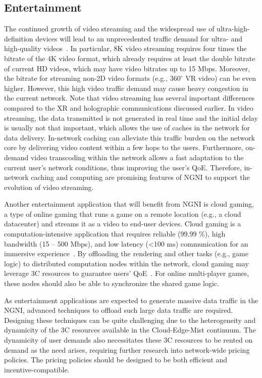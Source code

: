  \subsection{Entertainment}
 
\noindent The continued growth of video streaming and the widespread use of ultra-high-definition devices  will lead to an unprecedented traffic demand for ultra- and high-quality videos~\cite{rufino20216g}. In particular, 8K video streaming requires four times the bitrate of the 4K video format, which already requires at least the double bitrate of current HD videos, which may have video bitrates up to 15 Mbps. Moreover, the bitrate for streaming non-2D video formats (e.g., $360^\circ$ VR video) can be even higher. However, this high video traffic demand may cause heavy congestion in the current network. Note that video streaming has several important differences compared to the XR and holographic communications discussed earlier.  In video streaming, the data transmitted is not generated in real time and the initial delay is usually not that important, which allows the use of caches in the network for data delivery.  In-network caching can alleviate this traffic burden on the network core by delivering video content within a few hops to the users. Furthermore, on-demand video transcoding within the network allows a fast adaptation to the current user's network conditions, thus improving the user's QoE. Therefore, in-network caching and computing are promising features of NGNI to support the evolution of video streaming.
 
 Another entertainment application that will benefit from NGNI is cloud gaming, a type of online gaming that runs a game on a remote location (e.g., a cloud datacenter) and streams it as a video to end-user devices. Cloud gaming is a computation-intensive application that requires reliable (99.99 \%), high bandwidth (15 -- 500 Mbps), and low latency (\textless  100 ms) communication for an immersive experience~\cite{9464920}. By offloading the rendering and other tasks (e.g., game logic) to distributed computation nodes within the network, cloud gaming may leverage 3C resources to guarantee users’ QoE~\cite{8685768}. For online multi-player games, these nodes should also be able to synchronize the shared game logic.
 
 As entertainment applications are expected to generate massive data traffic in the NGNI, advanced techniques to offload such large data traffic are required. Designing these techniques can be quite challenging due to the heterogeneity and dynamicity of the  3C resources available in the Cloud-Edge-Mist continuum.  The dynamicity of user demands also necessitates these 3C resources to be rented on demand as the need arises, requiring further research into network-wide pricing policies.  The pricing policies should be designed to be both efficient and incentive-compatible.
 

